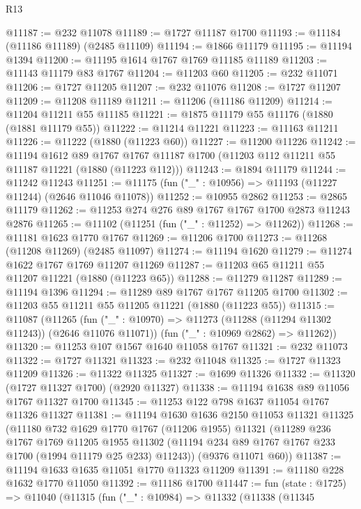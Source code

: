 \begin{lexlean}{R13}
\begin{coremodule}
@11187 := @232 @11078
@11189 := @1727 @11187 @1700
@11193 := @11184 (@11186 @11189) (@2485 @11109)
@11194 := @1866 @11179
@11195 := @11194 @1394
@11200 := @11195 @1614 @1767 @1769 @11185 @11189
@11203 := @11143 @11179 @83 @1767
@11204 := @11203 @60
@11205 := @232 @11071
@11206 := @1727 @11205
@11207 := @232 @11076
@11208 := @1727 @11207
@11209 := @11208 @11189
@11211 := @11206 (@11186 @11209)
@11214 := @11204 @11211 @55 @11185
@11221 := @1875 @11179 @55 @11176 (@1880 (@1881 @11179 @55))
@11222 := @11214 @11221
@11223 := @11163 @11211
@11226 := @11222 (@1880 (@11223 @60))
@11227 := @11200 @11226
@11242 := @11194
    @1612
    @89
    @1767
    @1767
    @11187
    @1700
    (@11203 @112 @11211 @55 @11187 @11221 (@1880 (@11223 @112)))
@11243 := @1894 @11179
@11244 := @11242 @11243
@11251 := @11175 (fun ("_" : @10956) => @11193 (@11227 @11244) (@2646 @11046 @11078))
@11252 := @10955 @2862
@11253 := @2865 @11179
@11262 := @11253 @274 @276 @89 @1767 @1767 @1700 @2873 @11243 @2876
@11265 := @11102 (@11251 (fun ("_" : @11252) => @11262))
@11268 := @11181 @1623 @1770 @1767
@11269 := @11206 @1700
@11273 := @11268 (@11208 @11269) (@2485 @11097)
@11274 := @11194 @1620
@11279 := @11274 @1622 @1767 @1769 @11207 @11269
@11287 := @11203 @65 @11211 @55 @11207 @11221 (@1880 (@11223 @65))
@11288 := @11279 @11287
@11289 := @11194 @1396
@11294 := @11289 @89 @1767 @1767 @11205 @1700
@11302 := @11203 @55 @11211 @55 @11205 @11221 (@1880 (@11223 @55))
@11315 := @11087
    (@11265
      (fun ("_" : @10970) => @11273 (@11288 (@11294 @11302 @11243)) (@2646 @11076 @11071))
      (fun ("_" : @10969 @2862) => @11262))
@11320 := @11253 @107 @1567 @1640 @11058 @1767
@11321 := @232 @11073
@11322 := @1727 @11321
@11323 := @232 @11048
@11325 := @1727 @11323 @11209
@11326 := @11322 @11325
@11327 := @1699 @11326
@11332 := @11320 (@1727 @11327 @1700) (@2920 @11327)
@11338 := @11194 @1638 @89 @11056 @1767 @11327 @1700
@11345 := @11253 @122 @798 @1637 @11054 @1767 @11326 @11327
@11381 := @11194
    @1630
    @1636
    @2150
    @11053
    @11321
    @11325
    (@11180
      @732
      @1629
      @1770
      @1767
      (@11206 @1955)
      @11321
      (@11289
        @236
        @1767
        @1769
        @11205
        @1955
        @11302
        (@11194 @234 @89 @1767 @1767 @233 @1700 (@1994 @11179 @25 @233) @11243))
      (@9376 @11071 @60))
@11387 := @11194 @1633 @1635 @11051 @1770 @11323 @11209
@11391 := @11180 @228 @1632 @1770 @11050
@11392 := @11186 @1700
@11447 := fun (state : @1725) =>
  @11040
    (@11315
      (fun ("_" : @10984) =>
      @11332
        (@11338
          (@11345

\end{coremodule}
\end{lexlean}
